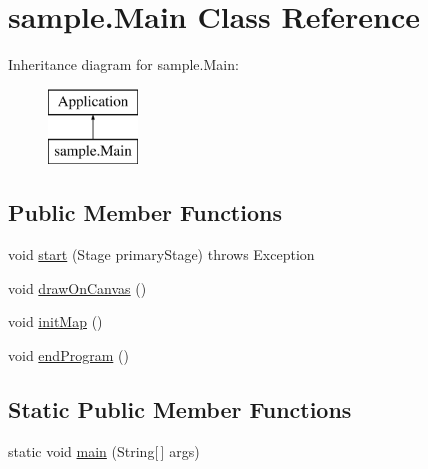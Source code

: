 \hypertarget{classsample_1_1_main}{}\section{sample.\+Main Class Reference}
\label{classsample_1_1_main}
Inheritance diagram for sample.\+Main\+:\begin{figure}[H]
\begin{center}
\leavevmode
\includegraphics[height=2.000000cm]{classsample_1_1_main}
\end{center}
\end{figure}
\subsection*{Public Member Functions}
\begin{DoxyCompactItemize}
\item 
void \hyperlink{classsample_1_1_main_a64ba37c898ca967654307543954cd09d}{start} (Stage primary\+Stage)  throws Exception
\item 
void \hyperlink{classsample_1_1_main_aaa12a3fda87745c46cc6a3b2fbbb55ee}{draw\+On\+Canvas} ()
\item 
void \hyperlink{classsample_1_1_main_aaefc601de8d34a33e916f6187c793b29}{init\+Map} ()
\item 
void \hyperlink{classsample_1_1_main_afb2b026a5f80dedc650f7edca34200bb}{end\+Program} ()
\end{DoxyCompactItemize}
\subsection*{Static Public Member Functions}
\begin{DoxyCompactItemize}
\item 
static void \hyperlink{classsample_1_1_main_ab70e98057c0f40b833a38ea10a74eceb}{main} (String\mbox{[}$\,$\mbox{]} args)
\end{DoxyCompactItemize}
